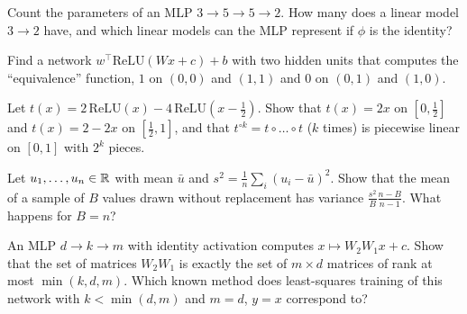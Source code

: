 \begin{notechapter}
\begin{exercise}\label{feedforward-networks:exr:1}
Count the parameters of an MLP $3\to5\to5\to2$. How many does a linear model $3\to2$ have,
and which linear models can the MLP represent if $\phi$ is the identity?
\end{exercise}

\begin{exercise}\label{feedforward-networks:exr:2}
Find a network $w^\top\mathrm{ReLU}(Wx + c) + b$ with two hidden units that computes the ``equivalence''
function, $1$ on $(0,0)$ and $(1,1)$ and $0$ on $(0,1)$ and $(1,0)$.
\end{exercise}

\begin{exercise}\label{feedforward-networks:exr:3}
Let $t(x) = 2\,\mathrm{ReLU}(x) - 4\,\mathrm{ReLU}(x - \frac12)$. Show that $t(x) = 2x$ on $[0,\frac12]$ and $t(x) = 2 - 2x$ on $[\frac12,1]$, and
that $t^{\circ k} = t\circ\dots\circ t$ ($k$ times) is piecewise linear on $[0,1]$ with $2^k$ pieces.
\end{exercise}

\begin{exercise}\label{feedforward-networks:exr:4}
Let $u_1,\dots,u_n\in\mathbb{R}$ with mean $\bar u$ and $s^2 = \frac1n\sum_i(u_i - \bar u)^2$. Show that the mean of a sample of $B$
values drawn without replacement has variance $\frac{s^2}B\frac{n - B}{n - 1}$. What happens for $B = n$?
\end{exercise}

\begin{exercise}\label{feedforward-networks:exr:5}
An MLP $d\to k\to m$ with identity activation computes $x\mapsto W_2W_1x + c$. Show that the set of
matrices $W_2W_1$ is exactly the set of $m\times d$ matrices of rank at most $\min(k, d, m)$. Which known
method does least-squares training of this network with $k<\min(d,m)$ and $m = d$, $y = x$
correspond to?
\end{exercise}
\end{notechapter}
